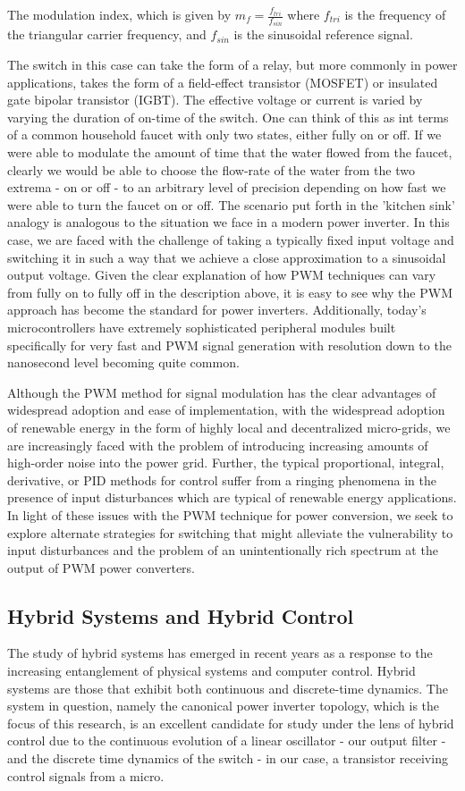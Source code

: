 The modulation index, which is given by $m_f=\frac{f_{tri}}{f_{sin}}$ where $f_{tri}$ is the frequency of the triangular carrier frequency, and $f_{sin}$ is the sinusoidal reference signal. 

The switch in this case can take the form of a relay, but more commonly in power applications, takes the form of a field-effect transistor (MOSFET) or insulated gate bipolar transistor (IGBT). The effective voltage or current is varied by varying the duration of on-time of the switch. One can think of this as int terms of a common household faucet with only two states, either fully on or off. If we were able to modulate the amount of time that the water flowed from the faucet, clearly we would be able to choose the flow-rate of the water from the two extrema - on or off - to an arbitrary level of precision depending on how fast we were able to turn the faucet on or off. The scenario put forth in the 'kitchen sink' analogy is analogous to the situation we face in a modern power inverter. In this case, we are faced with the challenge of taking a typically fixed input voltage and switching it in such a way that we achieve a close approximation to a sinusoidal output voltage. Given the clear explanation of how PWM techniques can vary from fully on to fully off in the description above, it is easy to see why the PWM approach has become the standard for power inverters. Additionally, today's microcontrollers have extremely sophisticated peripheral modules built specifically for very fast and PWM signal generation with resolution down to the nanosecond level becoming quite common. 

Although the PWM method for signal modulation has the clear advantages of widespread adoption and ease of implementation, with the widespread adoption of renewable energy in the form of highly local and decentralized micro-grids, we are increasingly faced with the problem of introducing increasing amounts of high-order noise into the power grid. Further, the typical proportional, integral, derivative, or PID methods for control suffer from a ringing phenomena in the presence of input disturbances which are typical of renewable energy applications. In light of these issues with the PWM technique for power conversion, we seek to explore alternate strategies for switching that might alleviate the vulnerability to  input disturbances and the problem of an unintentionally rich spectrum at the output of PWM power converters. 

\subsection{Hybrid Systems and Hybrid Control}
The study of hybrid systems has emerged in recent years as a response to the increasing entanglement of physical systems and computer control. 
Hybrid systems are those that exhibit both continuous and discrete-time dynamics. The system in question, namely the canonical power inverter topology, which is the focus of this research, is an excellent candidate for study under the lens of hybrid control due to the continuous evolution of a linear oscillator - our output filter - and the discrete time dynamics of the switch - in our case, a transistor receiving control signals from a micro. 

